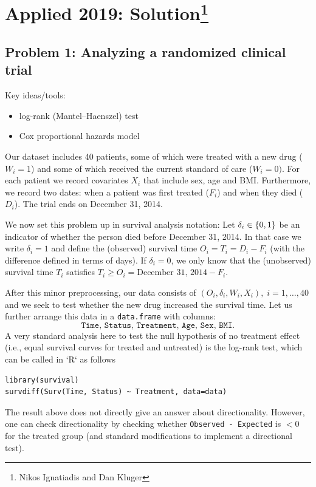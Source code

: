 \section{Applied 2019: Solution\footnote{Nikos Ignatiadis and Dan Kluger}}



\subsection*{Problem 1: Analyzing a randomized clinical trial}

Key ideas/tools:
\begin{itemize}
  \item log-rank (Mantel--Haenszel) test
  \item Cox proportional hazards model
\end{itemize}

Our dataset includes 40 patients, some of which were treated with a new drug ($W_i=1$) and some of which received the current standard of care ($W_i=0)$. For each patient we record covariates $X_i$ that include sex, age and BMI. Furthermore, we record two dates: when a patient was first treated ($F_i$) and when they died ($D_i$). The trial ends on December 31, 2014. 

We now set this problem up in survival analysis notation: Let $\delta_i \in \left\{0,1\right\}$ be an indicator of whether the person died before December 31, 2014. In that case we write $\delta_i=1$ and define the (observed) survival time $O_i=T_i = D_i - F_i$ (with the difference defined in terms of days). If $\delta_i =0$, we only know that the (unobserved) survival time $T_i$ satisfies  $T_i\geq O_i = \text{December 31, 2014} - F_i$.        

After this minor preprocessing, our data consists of $(O_i, \delta_i, W_i, X_i), \; i=1,\dotsc,40$ and we seek to test whether the new drug increased the survival time. Let us further arrange this data in a \texttt{data.frame} with columns: 
$$\texttt{Time, Status, Treatment, Age, Sex, BMI}.$$ 
A very standard analysis here to test the null hypothesis of no treatment effect (i.e., equal survival curves for treated and untreated) is the log-rank test, which can be called in `R` as follows
\begin{verbatim}
library(survival)
survdiff(Surv(Time, Status) ~ Treatment, data=data)
\end{verbatim}
The result above does not directly give an answer about directionality. However, one can check directionality by checking whether \texttt{Observed - Expected} is $<0$ for the treated group (and standard modifications to implement a directional test).

